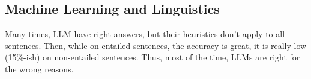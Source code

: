 \documentclass{cours}
\begin{document}
\subsection{Machine Learning and Linguistics}
Many times, LLM have right answers, but their heuristics don't apply to all sentences. Then, while on entailed sentences, the accuracy is great, it is really low (15\%-ish) on non-entailed sentences. Thus, most of the time, LLMs are right for the wrong reasons.
\end{document}

